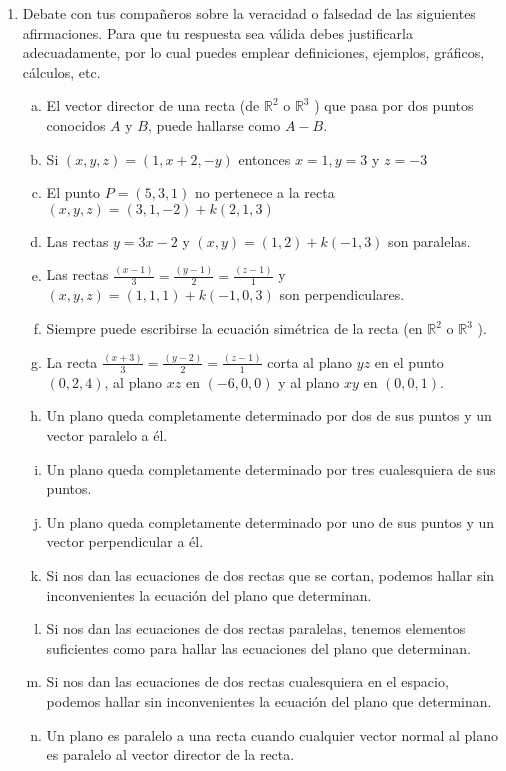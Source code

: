 \documentclass[11pt,a4paper]{article}
\begin{document}
\begin{enumerate}
\item Debate con tus compa\~neros sobre la veracidad o falsedad de las si\-guien\-tes afirmaciones. Para que tu respuesta sea v\'alida debes justificarla adecuadamente, por lo cual puedes emplear definiciones, ejemplos, gr\'aficos, c\'alculos, etc.

\begin{enumerate}[a)]
\item El vector director de una recta (de $\mathbb{R}^{2}$ o $\mathbb{R}^{3}$ ) que pasa por dos puntos conocidos $A$ y $B$, puede hallarse como $A-B$.
\item Si $(x, y, z) = (1, x + 2, -y)$ entonces $x = 1, y = 3$ y $z = -3$
\item El punto $P = (5, 3, 1)$ no pertenece a la recta $(x, y, z) = (3, 1,-2) + k (2, 1, 3)$
\item Las rectas $y = 3x - 2$ y $(x, y) = (1, 2) + k (-1, 3)$ son paralelas.
\item Las rectas $\frac{(x - 1)}{3} = \frac{(y - 1)}{2} = \frac{(z - 1)}{1}$ y $(x, y, z) = (1, 1, 1) + k (-1, 0, 3)$ son perpendiculares.
\item Siempre puede escribirse la ecuación sim\'etrica de la recta (en $\mathbb{R}^{2}$ o $\mathbb{R}^{3}$ ).
\item La recta $\frac{(x + 3)}{3} = \frac{(y - 2)}{2} = \frac{(z - 1)}{1}$ corta al plano $yz$ en el punto $(0, 2, 4)$, al plano $xz$ en $(-6, 0, 0)$ y al plano $xy$ en $(0, 0,1)$.
\item Un plano queda completamente determinado por dos de sus puntos y un vector paralelo a \'el.
\item Un plano queda completamente determinado por tres cualesquiera de sus puntos.
\item Un plano queda completamente determinado por uno de sus puntos y un vector perpendicular a \'el.
\item Si nos dan las ecuaciones de dos rectas que se cortan, podemos hallar sin inconvenientes la ecuaci\'on del plano que determinan.
\item Si nos dan las ecuaciones de dos rectas paralelas, tenemos elementos suficientes como para hallar las ecuaciones del plano que determinan.
\item Si nos dan las ecuaciones de dos rectas cualesquiera en el espacio, podemos hallar sin inconvenientes la ecuaci\'on del plano que determinan.
\item Un plano es paralelo a una recta cuando cualquier vector normal al plano es paralelo al vector director de la recta.

\end{enumerate}
\end{enumerate}
\end{document}
